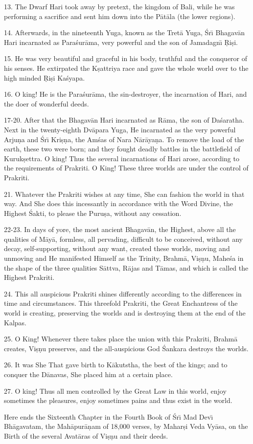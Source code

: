 13. The Dwarf Hari took away by pretext, the kingdom of Bali, while he was performing a sacrifice and sent him down into the P\=at\=ala (the lower regions).

14. Afterwards, in the nineteenth Yuga, known as the Tret\=a Yuga, \'Sr\={\i} Bhagav\=an Hari incarnated as Para\'sur\=ama, very powerful and the son of Jamadagn\={\i} \d{R}i\d{s}i.

15. He was very beautiful and graceful in his body, truthful and the conqueror of his senses. He extirpated the K\d{s}attriya race and gave the whole world over to the high minded \d{R}i\d{s}i Ka\'syapa.

16. O king! He is the Para\'sur\=ama, the sin-destroyer, the incarnation of Hari, and the doer of wonderful deeds.

17-20. After that the Bhagav\=an Hari incarnated as R\=ama, the son of Da\'saratha. Next in the twenty-eighth Dv\=apara Yuga, He incarnated as the very powerful Arju\d{n}a and \'Sr\={\i} Kri\d{s}\d{n}a, the Am\'sas of Nara N\=ar\=aya\d{n}a. To remove the load of the earth, these two were born; and they fought deadly battles in the battlefield of Kuruk\d{s}ettra. O king! Thus the several incarnations of Hari arose, according to the requirements of Prakriti. O King! These three worlds are under the control of Prakriti.

21. Whatever the Prakriti wishes at any time, She can fashion the world in that way. And She does this incessantly in accordance with the Word Divine, the Highest \'Sakti, to please the Puru\d{s}a, without any cessation.

22-23. In days of yore, the most ancient Bhagav\=an, the Highest, above all the qualities of M\=ay\=a, formless, all pervading, difficult to be conceived, without any decay, self-supporting, without any want, created these worlds, moving and unmoving and He manifested Himself as the Trinity, Brahm\=a, Vi\d{s}\d{n}u, Mahe\'sa in the shape of the three qualities S\=attva, R\=ajas and T\=amas, and which is called the Highest Prakriti.

24. This all auspicious Prakriti shines differently according to the differences in time and circumstances. This threefold Prakriti, the Great Enchantress of the world is creating, preserving the worlds and is destroying them at the end of the Kalpas.

25. O King! Whenever there takes place the union with this Prakriti, Brahm\=a creates, Vi\d{s}\d{n}u preserves, and the all-auspicious God \'Sankara destroys the worlds.

26. It was She That gave birth to K\=akutstha, the best of the kings; and to conquer the D\=anavas, She placed him at a certain place.

27. O king! Thus all men controlled by the Great Law in this world, enjoy sometimes the pleasures, enjoy sometimes pains and thus exist in the world.

Here ends the Sixteenth Chapter in the Fourth Book of \'Sr\={\i} Mad Dev\={\i} Bh\=agavatam, the Mah\=apur\=a\d{n}am of 18,000 verses, by Mahar\d{s}i Veda Vy\=asa, on the Birth of the several Avat\=aras of Vi\d{s}\d{n}u and their deeds.



